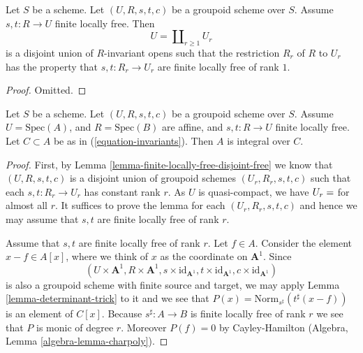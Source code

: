 \begin{lemma}
\label{lemma-finite-locally-free-disjoint-free}
Let $S$ be a scheme. Let $(U, R, s, t, c)$ be a groupoid scheme over $S$.
Assume $s, t : R \to U$ finite locally free.
Then
$$
U = \coprod\nolimits_{r \geq 1} U_r
$$
is a disjoint union of $R$-invariant opens such that the restriction $R_r$ of
$R$ to $U_r$ has the property that $s,t : R_r \to U_r$ are finite locally
free of rank $1$.
\end{lemma}

\begin{proof}
Omitted.
\end{proof}

\begin{lemma}
\label{lemma-integral-over-invariants}
Let $S$ be a scheme. Let $(U, R, s, t, c)$ be a groupoid scheme over $S$.
Assume $U = \text{Spec}(A)$, and $R = \text{Spec}(B)$ are affine, and
$s, t : R \to U$ finite locally free.
Let $C \subset A$ be as in (\ref{equation-invariants}).
Then $A$ is integral over $C$.
\end{lemma}

\begin{proof}
First, by Lemma \ref{lemma-finite-locally-free-disjoint-free}
we know that $(U, R, s, t, c)$ is a disjoint union
of groupoid schemes $(U_r, R_r, s, t, c)$ such that each $s, t : R_r \to U_r$
has constant rank $r$. As $U$ is quasi-compact, we have $U_r = \empty$ for
almost all $r$. It suffices to prove the lemma for each $(U_r, R_r, s, t, c)$
and hence we may assume that $s, t$ are finite locally free of rank $r$.

\medskip\noindent
Assume that $s,t$ are finite locally free of rank $r$.
Let $f \in A$. Consider the element $x - f \in A[x]$, where we think
of $x$ as the coordinate on $\mathbf{A}^1$.
Since
$$
(U \times \mathbf{A}^1, R \times \mathbf{A}^1,
s \times \text{id}_{\mathbf{A}^1},
t \times \text{id}_{\mathbf{A}^1},
c \times \text{id}_{\mathbf{A}^1})
$$
is also a groupoid scheme with finite source and target, we may apply
Lemma \ref{lemma-determinant-trick} to it and we see that
$P(x) = \text{Norm}_{s^\sharp}(t^\sharp(x - f))$
is an element of $C[x]$. Because $s^\sharp : A \to B$ is finite locally
free of rank $r$ we see that $P$ is monic of degree $r$.
Moreover $P(f) = 0$ by Cayley-Hamilton
(Algebra, Lemma \ref{algebra-lemma-charpoly}).
\end{proof}

